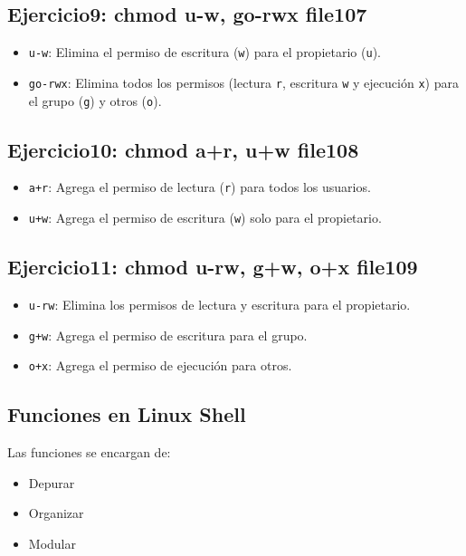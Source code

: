 \documentclass[11pt,twoside]{book}
\begin{document}
         \subsection*{Ejercicio9: chmod u-w, go-rwx file107}
        \begin{itemize}
          \item \verb|u-w|: Elimina el permiso de escritura (\verb|w|) para el propietario (\verb|u|). 
          \item \verb|go-rwx|: Elimina todos los permisos (lectura \verb|r|, escritura \verb|w| y ejecución \verb|x|) para el grupo (\verb|g|) y otros (\verb|o|). 
        \end{itemize}

         \subsection*{Ejercicio10: chmod a+r, u+w file108}
        \begin{itemize}
          \item \verb|a+r|: Agrega el permiso de lectura (\verb|r|) para todos los usuarios. 
          \item \verb|u+w|: Agrega el permiso de escritura (\verb|w|) solo para el propietario. 
        \end{itemize}

         \subsection*{Ejercicio11: chmod u-rw, g+w, o+x file109}
        \begin{itemize}
          \item \verb|u-rw|: Elimina los permisos de lectura y escritura para el propietario.
          \item  \verb|g+w|: Agrega el permiso de escritura para el grupo. 
          \item \verb|o+x|: Agrega el permiso de ejecución para otros. 
        \end{itemize}
        
       

\subsection{Funciones en Linux Shell}
Las funciones se encargan de:
\begin{itemize}
    \item Depurar 
    \item Organizar
    \item Modular
\end{itemize}
\end{document}
